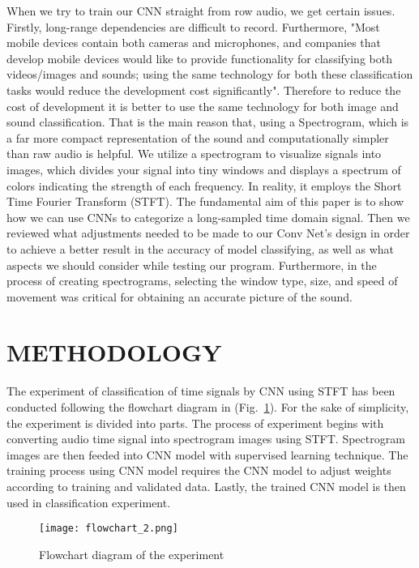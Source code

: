 \documentclass[conference]{IEEEtran}
\begin{document}
When we try to train our CNN straight from row audio, we get certain issues. Firstly, long-range dependencies are difficult to record. Furthermore, "Most  mobile  devices  contain  both  cameras  and  microphones,  and  companies  that  develop  mobile  devices  would  like  to  provide  functionality  for  classifying both videos/images and sounds; using the same technology for both these classification tasks would reduce the development cost significantly"\cite{b8}. Therefore to reduce the cost of development it is better to use the same technology for both image and sound classification. That is the main reason that, using a Spectrogram, which is a far more compact representation of the sound and computationally simpler than raw audio is helpful. We utilize a spectrogram to visualize signals into images, which divides your signal into tiny windows and displays a spectrum of colors indicating the strength of each frequency. In reality, it employs the Short Time Fourier Transform (STFT). The fundamental aim of this paper is to show how we can use CNNs to categorize a long-sampled time domain signal. Then we reviewed what adjustments needed to be made to our Conv Net's design in order to achieve a better result in the accuracy of model classifying, as well as what aspects we should consider while testing our program. Furthermore, in the process of creating spectrograms, selecting the window type, size, and speed of movement was critical for obtaining an accurate picture of the sound.


\section{METHODOLOGY}

The experiment of classification of time signals by CNN using STFT has been conducted following the flowchart diagram in (Fig.~\ref{fig_flowchart}).
For the sake of simplicity, the experiment is divided into parts. The process of experiment begins with converting audio time signal into spectrogram images using STFT. Spectrogram images are then feeded into CNN model with supervised learning technique. The training process using CNN model requires the CNN model to adjust weights according to training and validated data. Lastly, the trained CNN model is then used in classification experiment.

\newpage
\begin{figure}[htbp]
\centerline{\texttt{[image: flowchart\_2.png]}}
\caption{Flowchart diagram of the experiment}
\label{fig_flowchart}
\end{figure}
\end{document}
